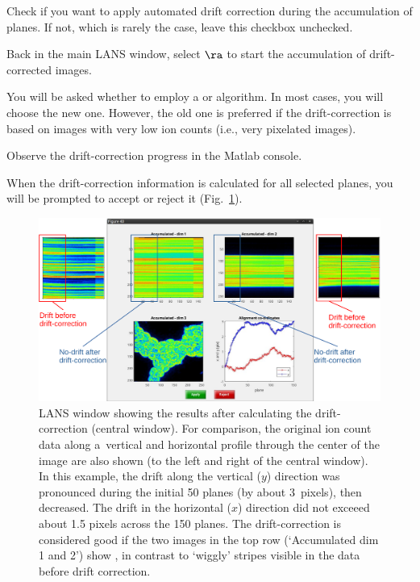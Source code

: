 \s Check  if you want to apply automated drift correction during the accumulation of planes. If not, which is rarely the case, leave this checkbox unchecked.

\s Back in the main LANS window, select  $\ra$  to start the accumulation of drift-corrected images. 

\nb
\bul You will be asked whether to employ a  or  algorithm. In most cases, you will choose the new one. However, the old one is preferred if the drift-correction is based on images with very low ion counts (i.e., very pixelated images).

\bul Observe the drift-correction progress in the Matlab console. 

\bul When the drift-correction information is calculated for all selected planes, you will be prompted to accept or reject it (Fig.~\ref{fig:drift-correction}). 

\begin{figure}[!ht]
\centering
\includegraphics[width=\textwidth]{figs3/LANS-drift-correction}
\caption{\label{fig:drift-correction}%
LANS window showing the results after calculating the drift-correction (central window). For comparison, the original ion count data along a~vertical and horizontal profile through the center of the image are also shown (to the left and right of the central window). In this example, the drift along the vertical ($y$) direction was pronounced during the initial 50 planes (by about 3~pixels), then decreased. The drift in the horizontal ($x$) direction did not exceeed about 1.5 pixels across the 150 planes. The drift-correction is considered good if the two images in the top row (`Accumulated dim 1 and 2') show , in contrast to `wiggly' stripes visible in the data before drift correction.}
\end{figure}


